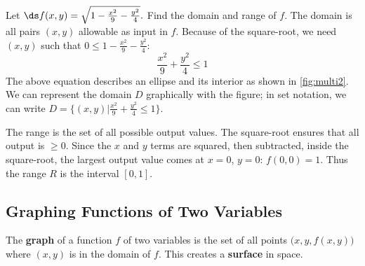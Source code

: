 \begin{example}\label{ex_multi2}
Let $\ds f(x,y) = \sqrt{1-\frac{x^2}9-\frac{y^2}4}.$ Find the domain and range of $f$.
\solution
The domain is all pairs $(x,y)$ allowable as input in $f$. Because of the square-root, we need $(x,y)$ such that $0\leq1-\frac{x^2}9-\frac{y^2}4$:
\[\frac{x^2}9+\frac{y^2}4 \leq 1\]
The above equation describes an ellipse and its interior as shown in \autoref{fig:multi2}. We can represent the domain $D$ graphically with the figure; in set notation, we can write $D = \{(x,y)\vert\frac{x^2}9+\frac{y^2}4 \leq 1\}$.

The range is the set of all possible output values. The square-root ensures that all output is $\geq 0$. Since the $x$ and $y$ terms are squared, then subtracted, inside the square-root, the largest output value comes at $x=0$, $y=0$: $f(0,0) = 1$. Thus the range $R$ is the interval $[0,1]$.
\end{example}

\subsection{Graphing Functions of Two Variables}


The \textbf{graph} of a function $f$ of two variables is the set of all points $\bigl(x,y,f(x,y)\bigr)$ where $(x,y)$ is in the domain of $f$. This creates a \textbf{surface} in space.

